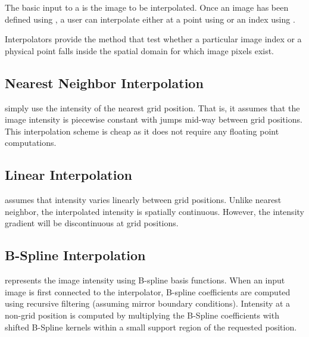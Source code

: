 
The basic input to a  is the image to
be interpolated. Once an image has been defined using ,
a user can interpolate either at a point using  or
an index using .
 
Interpolators provide the method  that test whether a
particular image index or a physical point falls inside the spatial domain for
which image pixels exist.

\subsection{Nearest Neighbor Interpolation}
\label{sec:NearestNeighborInterpolation}
 simply use the intensity of
the nearest grid position. That is, it assumes that the image intensity
is piecewise constant with jumps mid-way between grid positions. 
This interpolation scheme is cheap as it does not require any 
floating point computations.

\subsection{Linear Interpolation}
\label{sec:LinearInterpolation}
 assumes that intensity varies linearly
between grid positions. Unlike nearest neighbor, the interpolated
intensity is spatially continuous. However, the intensity gradient
will be discontinuous at grid positions.

\subsection{B-Spline Interpolation}
\label{sec:BSplineInterpolation}
 represents the image intensity 
using B-spline basis functions. When an input image is first 
connected to the interpolator, B-spline 
coefficients are computed using recursive filtering (assuming mirror
boundary conditions). Intensity at a non-grid position is computed
by multiplying the B-Spline coefficients with shifted B-Spline kernels
within a small support region of the requested position.

